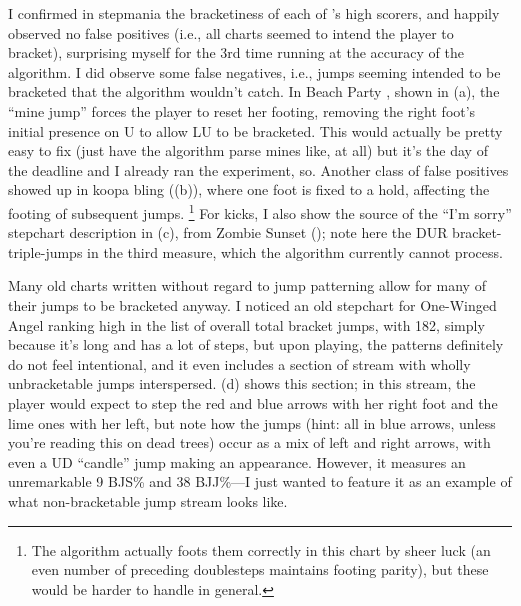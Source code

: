 \documentclass[10pt]{sigplanconf}
\begin{document}
I confirmed in stepmania the bracketiness of each of 's high scorers,
and happily observed no false positives (i.e., all charts seemed to intend the player to bracket),
surprising myself for the 3rd time running at the accuracy of the algorithm.
I did observe some false negatives, i.e., jumps seeming intended to be bracketed that the algorithm wouldn't catch.
In Beach Party \cite{beachparty}, shown in (a),
the ``mine jump'' forces the player to reset her footing,
removing the right foot's initial presence on U to allow LU to be bracketed.
This would actually be pretty easy to fix (just have the algorithm parse mines like, at all)
but it's the day of the deadline and I already ran the experiment, so.
Another class of false positives showed up in koopa bling \cite{koopa} ((b)),
where one foot is fixed to a hold, affecting the footing of subsequent jumps.%
\footnote{The algorithm actually foots them correctly in this chart by sheer luck (an even number of preceding doublesteps maintains footing parity),
but these would be harder to handle in general.}
For kicks, I also show the source of the ``I'm sorry'' stepchart description in (c),
from Zombie Sunset \cite{zombie} ();
note here the DUR bracket-triple-jumps in the third measure,
which the algorithm currently cannot process.

Many old charts written without regard to jump patterning allow for many of their jumps to be bracketed anyway.
I noticed an old stepchart for One-Winged Angel \cite{owa} ranking high in the list of overall total bracket jumps,
with 182,
simply because it's long and has a lot of steps,
but upon playing, the patterns definitely do not feel intentional,
and it even includes a section of stream with wholly unbracketable jumps interspersed.
(d) shows this section;
in this stream, the player would expect to step the red and blue arrows with her right foot and the lime ones with her left,
but note how the jumps (hint: all in blue arrows, unless you're reading this on dead trees)
occur as a mix of left and right arrows, with even a UD ``candle'' jump making an appearance.
However, it measures an unremarkable 9 BJS\% and 38 BJJ\%---I just wanted to feature it
as an example of what non-bracketable jump stream looks like.
\end{document}
